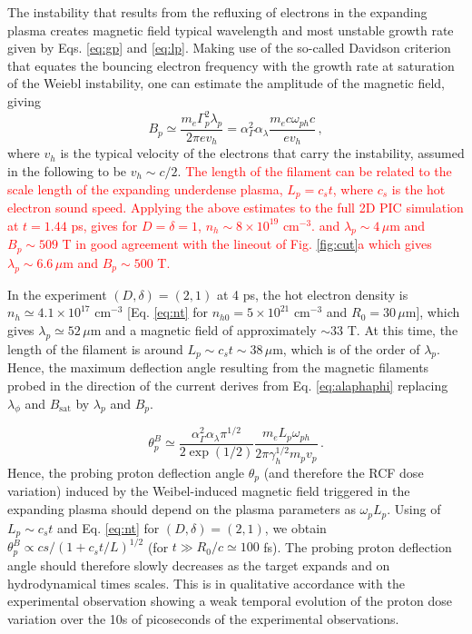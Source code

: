\documentclass[aps,showpacs,superscriptaddress]{revtex4}
\begin{document}
The instability that results from the refluxing of electrons in the expanding plasma creates magnetic field typical wavelength and most unstable growth rate given by Eqs.  \eqref{eq:gp} and \eqref{eq:lp}.
Making use of the so-called Davidson criterion \cite[]{POF_Davidson_1972} that equates the bouncing electron frequency with the growth rate at saturation of the Weiebl instability, one can estimate the amplitude of the magnetic field, giving
\begin{equation}\label{eq:bp}
B_p \simeq \frac{m_e \Gamma_p^2 \lambda_p}{2\pi e v_h} =   \alpha_\Gamma^2 \alpha_\lambda   \frac{m_ec\omega_{ph}c}{ e v_h} \, ,
\end{equation}
where $v_h$ is the typical  velocity  of the   electrons that carry the instability, assumed in the following to be $v_h\sim c/2$. 
\textcolor{red}{
The length of the filament can be related to the scale length of the expanding underdense plasma, $L_p = c_{s} t$, where $c_{s}$ is the hot electron sound speed.
Applying the above estimates to the full 2D PIC simulation at $t = 1.44$ ps, gives for $D=\delta=1$, $n_h  \sim  8 \times 10^{19}$ cm$^{-3}$.
 and $\lambda_p \sim 4 \, \mu$m 
and  $B_p \sim 509$ T in good agreement with the lineout of Fig. \ref{fig:cut}a which gives  $\lambda_p \sim 6.6 \, \mu$m 
and  $B_p \sim 500$ T.}

In the experiment $(D,\delta)=(2,1)$ at 4 ps, the hot electron density is $n_h\simeq 4.1\times 10^{17}$ cm$^{-3}$  [Eq. \eqref{eq:nt} for $n_{h0}=5\times 10^{21}$  cm$^{-3}$ and $R_0=30\, \mu$m], which gives $\lambda_p\simeq 52\, \mu$m and a magnetic field of approximately $\sim 33$ T. 
At this time, the length of the filament is around  $L_p \sim c_st \sim 38\, \mu$m, which is of the order of $\lambda_p$.
Hence, the maximum deflection angle resulting from  the magnetic filaments probed in the direction of the current derives from Eq. \eqref{eq:alaphaphi} replacing $\lambda_\phi$ and $B_\mathrm{sat}$ by $\lambda_p$ and $B_p$.

\begin{equation}
\theta^B_p \simeq  \frac{\alpha_\Gamma^2 \alpha_\lambda \pi^{1/2}}{2\exp(1/2)}      \frac{m_eL_p\omega_{ph}}{2\pi\gamma_h^{1/2}m_p v_p} \, . \label{eq:alaphap}
\end{equation}
Hence, the probing proton deflection angle $\theta_p$ (and therefore the RCF dose variation) induced by the Weibel-induced magnetic field triggered in the expanding plasma should 
depend on the plasma parameters as $\omega_pL_p$. Using of $L_p \sim c_st $ and Eq. \eqref{eq:nt} for $(D,\delta)=(2,1)$, we obtain $\theta^B_p\propto cs/(1+c_st/L)^{1/2}$ (for $t\gg R_0/c\simeq 100$ fs). The probing proton deflection angle should therefore slowly decreases as the   target expands and on hydrodynamical times scales.
This is in qualitative accordance with the experimental observation showing a weak temporal evolution of the proton dose variation over the 10s of picoseconds of the experimental observations.
\end{document}
